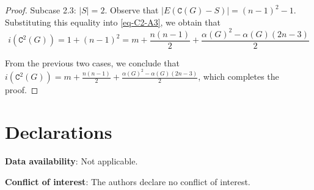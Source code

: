 \documentclass[12pt]{article}
\begin{document}
\begin{proof}
\vspace{.2cm}

\noindent
Subcase 2.3: $|S| = 2$. Observe that $|E(\mathtt{C}(G)-S)| = (n-1)^{2} - 1$. Substituting this equality into \eqref{eq-C2-A3}, we obtain that
\begin{equation*}
i(\mathtt{C}^{2}(G)) = 1 + (n-1)^{2}=   m + \frac{n(n-1)}{2} + \frac{\alpha(G)^{2} -\alpha(G) (2n-3)}{2}
\end{equation*}

\vspace{.25cm}

\noindent
From the previous two cases, we conclude that $i(\mathtt{C}^{2}(G)) = m + \frac{n(n-1)}{2} + \frac{\alpha(G)^{2} -\alpha(G) (2n-3)}{2}$, which completes the proof.
\end{proof}


\section*{Declarations}

\noindent
\textbf{Data availability}: Not applicable.

\vspace{.2cm}

\noindent
\textbf{Conflict of interest}: The authors declare no conflict of interest.
\end{document}
